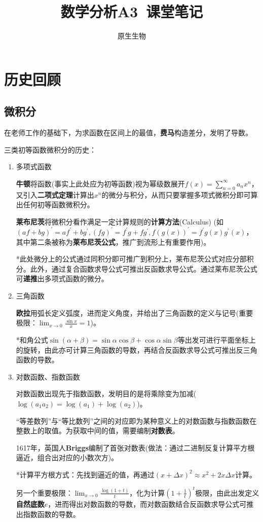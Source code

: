 \documentclass[a4paper,UTF8]{ctexart}
\title{\heiti 数学分析A3\ 课堂笔记}
\author{原生生物}
\date{}
\begin{document}
\maketitle

\tableofcontents

\newpage

\section*{历史回顾}

\subsection{微积分}
在老师工作的基础下，为求函数在区间上的最值，\textbf{费马}构造差分，发明了导数。

三类初等函数微积分的历史：

\begin{enumerate}
	
\item 多项式函数

\textbf{牛顿}将函数(事实上此处应为初等函数)视为幂级数展开$f(x)=\sum_{n=0}^{\infty}a_nx^n$，又引入\textbf{二项式定理}计算出$x^n$的微分与积分，从而只要掌握多项式微积分即可算出任何初等函数微积分。

\textbf{莱布尼茨}将微积分看作满足一定计算规则的\textbf{计算方法}(Calculus) (如$(af+bg)^\prime=af^\prime+bg^\prime, (fg)^\prime=f^\prime g+fg^\prime, f(g(x))^\prime=f^\prime g(x)g^\prime(x)$，其中第二条被称为\textbf{莱布尼茨公式}，推广到流形上有重要作用)。

*此处微分上的公式通过同积分即可推广到积分上，莱布尼茨公式对应分部积分。此外，通过复合函数求导公式可推出反函数求导公式。通过莱布尼茨公式可\textbf{递推}出多项式函数的微分。

\item 三角函数

\textbf{欧拉}用弧长定义弧度，进而定义角度，并给出了三角函数的定义与记号(重要极限：$\lim_{x\to0}\frac{\sin x}{x}=1$)。

*和角公式$\sin(\alpha+\beta)=\sin\alpha\cos\beta+\cos\alpha\sin\beta$等出发可进行平面坐标上的旋转，由此亦可计算三角函数的导数，再结合反函数求导公式可推出反三角函数的导数。

\item 对数函数、指数函数

对数函数出现先于指数函数，发明目的是将乘除变为加减($\log(a_1a_2)=\log(a_1)+\log(a_2)$)。

“等差数列”与“等比数列”之间的对应即为某种意义上的对数函数与指数函数在整数上的取值。为获取中间的值，需要编制\textbf{对数表}。

1617年，英国人\textbf{Briggs}编制了首张对数表(做法：通过二进制反复计算平方根逼近，组合出对应的小数次方)。

*计算平方根方式：先找到逼近的值，再通过$(x+\Delta x)^2\approx x^2+2x\Delta x$计算。

另一个重要极限：$\lim_{x\to 0}\frac{\log(1+t)}{t}$，化为计算$\left(1+\frac{1}{t}\right)^t$极限，由此出发定义\textbf{自然底数}$e$，进而得出对数函数的导数，而对数函数结合反函数求导公式可推出指数函数的导数。
\end{enumerate}
\end{document}
